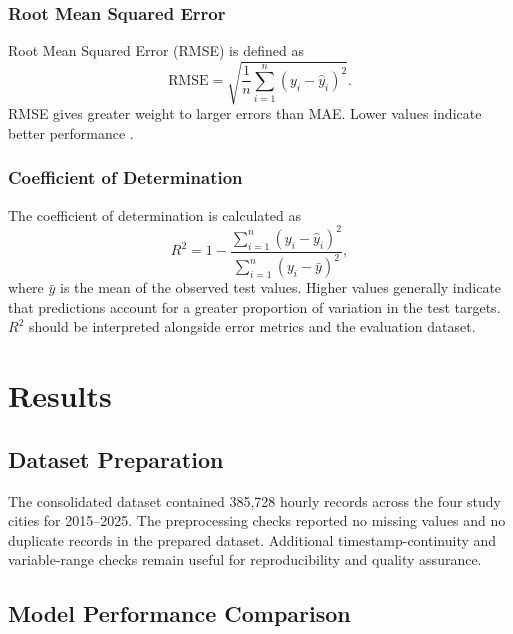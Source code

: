 \documentclass[12pt,a4paper]{article}
\begin{document}
	\subsubsection{Root Mean Squared Error}
	
	Root Mean Squared Error (RMSE) is defined as
	\begin{equation}
		\mathrm{RMSE}=\sqrt{\frac{1}{n}\sum_{i=1}^{n}
			(y_i-\widehat{y}_i)^2}.
	\end{equation}
	RMSE gives greater weight to larger errors than MAE. Lower values
	indicate better performance \cite{scikitlearnmetrics}.
	
	\subsubsection{Coefficient of Determination}
	
	The coefficient of determination is calculated as
	\begin{equation}
		R^2=1-\frac{\sum_{i=1}^{n}(y_i-\widehat{y}_i)^2}
		{\sum_{i=1}^{n}(y_i-\bar{y})^2},
	\end{equation}
	where $\bar{y}$ is the mean of the observed test values. Higher
	values generally indicate that predictions account for a greater
	proportion of variation in the test targets. $R^2$ should be
	interpreted alongside error metrics and the evaluation dataset.
	
	\section{Results}
	
	\subsection{Dataset Preparation}
	
	The consolidated dataset contained 385,728 hourly records across
	the four study cities for 2015--2025. The preprocessing checks
	reported no missing values and no duplicate records in the prepared
	dataset. Additional timestamp-continuity and variable-range checks
	remain useful for reproducibility and quality assurance.
	
	\subsection{Model Performance Comparison}
	
\end{document}
